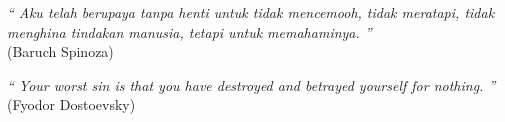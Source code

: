 

\begin{center}

    \textit{``
    Aku telah berupaya tanpa henti untuk tidak mencemooh, tidak meratapi, tidak menghina tindakan manusia, tetapi untuk memahaminya.
    ''} \\
    (Baruch Spinoza)

    \vspace{24pt}

    \textit{
        ``
        Your worst sin is that you have destroyed and betrayed yourself for nothing.
        ''
    } \\
    (Fyodor Dostoevsky) \\

\end{center}

\newpage

